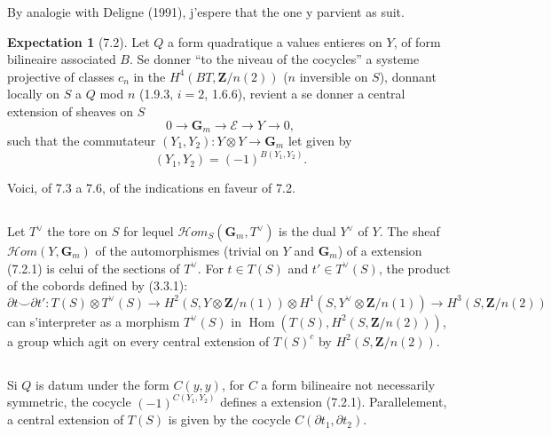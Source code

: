 \documentclass[11pt,a4paper]{article}
\theoremstyle{plain}
\theoremstyle{definition}
\newtheorem{espoir}[theorem]{Expectation}
\DeclareMathOperator{\Hom}{Hom}
\begin{document}
By analogie with Deligne (1991), j'espere that the one y parvient as suit.

\begin{espoir}[7.2]\label{7.2}
Let $Q$ a form quadratique a values entieres on $Y$, of form bilineaire associated $B$. Se donner ``to the niveau of the cocycles'' a systeme projective of classes $c_n$ in the $H^4(BT, \mathbf{Z}/n(2))$ ($n$ inversible on $S$), donnant locally on $S$ a $Q$ mod $n$ (1.9.3, $i = 2$, 1.6.6), revient a se donner a central extension of sheaves on $S$
\begin{equation}\label{7.2.1}
0 \to \mathbf{G}_m \to \mathscr{E} \to Y \to 0,
\end{equation}
such that the commutateur $(Y_1, Y_2) : Y \otimes Y \to \mathbf{G}_m$ let given by
\begin{equation}\label{7.2.2}
(Y_1, Y_2) = (-1)^{B(Y_1, Y_2)}.
\end{equation}
\end{espoir}

Voici, of 7.3 a 7.6, of the indications en faveur of 7.2.

\subsection{}\label{7.3}

Let $T^\vee$ the tore on $S$ for lequel $\mathscr{H}om_S(\mathbf{G}_m, T^\vee)$ is the dual $Y^\vee$ of $Y$. The sheaf $\mathscr{H}om(Y, \mathbf{G}_m)$ of the automorphismes (trivial on $Y$ and $\mathbf{G}_m$) of a extension (7.2.1) is celui of the sections of $T^\vee$. For $t \in T(S)$ and $t' \in T^\vee(S)$, the product of the cobords defined by (3.3.1):
\[
\partial t \smile \partial t' : T(S) \otimes T^\vee(S) \to H^2(S, Y \otimes \mathbf{Z}/n(1)) \otimes H^1(S, Y^\vee \otimes \mathbf{Z}/n(1)) \to H^3(S, \mathbf{Z}/n(2))
\]
can s'interpreter as a morphism $T^\vee(S)$ in $\Hom(T(S), H^2(S, \mathbf{Z}/n(2)))$, a group which agit on every central extension of $T(S)^c$ by $H^2(S, \mathbf{Z}/n(2))$.

\subsection{}\label{7.4}

Si $Q$ is datum under the form $C(y, y)$, for $C$ a form bilineaire not necessarily symmetric, the cocycle $(-1)^{C(Y_1, Y_2)}$ defines a extension (7.2.1). Parallelement, a central extension of $T(S)$ is given by the cocycle $C(\partial t_1, \partial t_2)$.
\end{document}
